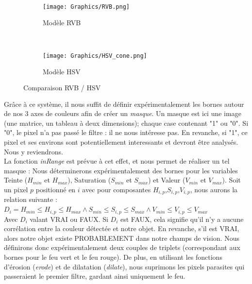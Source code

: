 \begin{itemize}
					\begin{figure}[H]
						\centering
						\begin{subfigure}[h]{0.35\textwidth}
					        \texttt{[image: Graphics/RVB.png]}
					        \caption{Modèle RVB}
					    \end{subfigure}
					    ~
					    \begin{subfigure}[h]{0.35\textwidth}
					        \texttt{[image: Graphics/HSV\_cone.png]}
					        \caption{Modèle HSV}
					    \end{subfigure}
					    \caption{Comparaison RVB / HSV}
					\end{figure}
					Grâce à ce système, il nous suffit de définir expérimentalement les bornes autour de nos 3 axes de couleurs afin de créer un \textit{masque}. Un masque est ici une image (une matrice, un tableau à deux dimensions); chaque case contenant "1" ou "0". Si "0", le pixel n'a pas passé le filtre : il ne nous intéresse pas. En revanche, si "1", ce pixel et ses environs sont potentiellement interessants et devront être analysés. Nous y reviendrons.\\
					La fonction \textit{inRange} est prévue à cet effet, et nous permet de réaliser un tel masque : 
					Nous déterminerons expérimentalement des bornes pour les variables Teinte ($H_{min}$ et $H_{max}$), Saturation ($S_{min}$ et $S_{max}$) et Valeur ($V_{min}$ et $V_{max}$). Soit un pixel $p$ positionné en $i$ avec pour composantes $H_{i,p}$,$S_{i,p}$,$V_{i,p}$, nous aurons la relation suivante :
					\\ 
					$D_i = H_{min} \leqslant H_{i,p} \leqslant H_{max} 	\land S_{min} \leqslant S_{i,p} \leqslant S_{max} \land V_{min} \leqslant V_{i,p} \leqslant V_{max}$ \cite{bib20}
					\\
					Avec $D_i$ valant VRAI ou FAUX. Si $D_i$ est FAUX, cela signifie qu'il n'y a aucune corrélation entre la couleur détectée et notre objet. En revanche, s'il est VRAI, alors notre objet existe PROBABLEMENT dans notre champs de vision. Nous définirons donc expérimentalement deux couples de triplets (correspondant aux bornes pour le feu vert et le feu rouge). De plus, en utilisant les fonctions d'érosion (\textit{erode}) et de dilatation (\textit{dilate}), nous suprimons les pixels parasites qui passeraient le premier filtre, gardant ainsi uniquement le feu.
					\\


\end{itemize}
